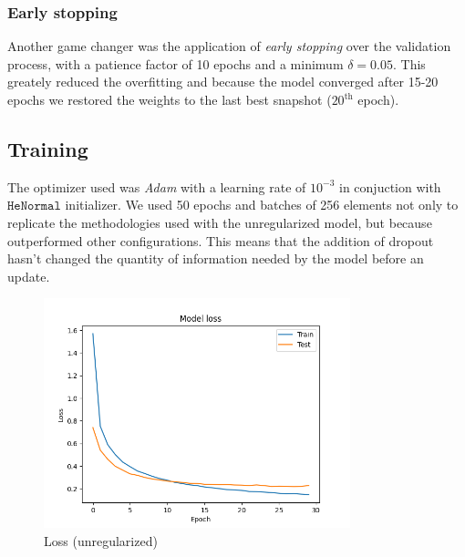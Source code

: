 \documentclass[compsoc]{IEEEtran}
\begin{document}
\subsubsection{Early stopping}
Another game changer was the application of \emph{early stopping} over the validation process, with a patience factor of 10 epochs and a minimum $\delta = 0.05$. This greately reduced the overfitting and because the model converged after 15-20 epochs we restored the weights to the last best snapshot ($20^{\text{th}}$ epoch).




\subsection{Training}
The optimizer used was \emph{Adam} with a learning rate of $10^{-3}$ in conjuction with $\texttt{HeNormal}$ initializer. We used 50 epochs and batches of 256 elements 
not only to replicate the methodologies used with the unregularized model, but because outperformed other configurations. This means that the addition of dropout hasn't changed the quantity of information needed by the model before an update.



\begin{figure}[ht!]
\centering                                                                        
\includegraphics[width=3.5in]{../images/reg/loss-LeakyReLU-NoneType-categorical_crossentropy-Adam-50-256-0.1-final.png}
\captionsetup{justification=centering}                                                                                                                              
\caption{Loss (unregularized)}
\label{fig:loss2}                                                                                                                                         
\end{figure}
\end{document}
